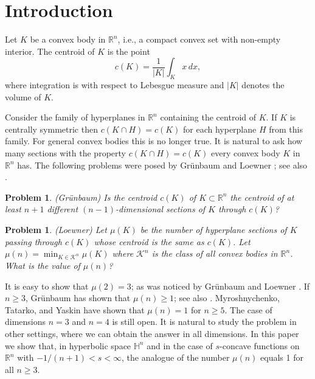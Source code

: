 \documentclass[12pt,letterpaper,reqno]{amsart}
\newtheorem{problem}[theorem]{Problem}
\theoremstyle{definition}
\begin{document}
\section{Introduction}

Let $K$ be a convex body in $\mathbb{R}^n$, i.e., a compact convex set with non-empty interior. The centroid of $K$ is the point
\begin{equation}\label{def-centroid}
c(K) = \frac{1}{|K|} \int_K x \, dx,
\end{equation}
where integration is with respect to Lebesgue measure and $|K|$ denotes the volume of $K$.


Consider the family of hyperplanes in $\mathbb R^n$ containing the centroid of $K$. If $K$ is centrally symmetric then $c(K\cap H)=c(K)$ for each hyperplane $H$ from this family. For general convex bodies this is no longer true. It is natural to ask  how many  sections with the property $c(K\cap H)=c(K)$ every  convex body $K$ in $\mathbb R^n$ has. The following problems were posed by Gr\"unbaum \cite{G1961} and Loewner \cite[Problem 28]{F}; see also \cite[A8]{CFG}.

\begin{problem}\label{GrunbaumProblem} (Gr\"unbaum)
	Is the centroid $c(K)$ of $K \subset \mathbb{R}^n$ the centroid of at least $n + 1$ different $(n-1)$-dimensional sections of $K$ through $c(K)$?
\end{problem}



\begin{problem}\label{LoewnerProblem} (Loewner)
	Let $\mu(K)$ be the number of hyperplane sections of $K$ passing through $c(K)$ whose centroid is the same as $c(K)$. Let $\mu(n) =\displaystyle \min_{K\in \mathcal K^n} \mu(K)$ where $\mathcal K^n$ is the class of all convex bodies in $\mathbb R^n$. What is the value of $\mu(n)$?

\end{problem}


It is easy to show that $\mu(2)=3$; as was noticed by Gr\"unbaum \cite{G1961} and Loewner \cite[Problem 28]{F}. If $n\ge 3$, Gr\"unbaum \cite{G1961} has shown that $\mu(n)\ge 1$;  see also \cite{MR}. 
Myroshnychenko, Tatarko, and Yaskin \cite{MTY2} have shown  that $\mu(n)=1$ for $n\ge 5$. The case of dimensions $n=3$ and $n=4$ is still open. It is natural to study the problem in other settings, where we can obtain the answer in all dimensions.
In this paper we show that, in  hyperbolic space $\mathbb H^n$ and in the case of $s$-concave functions on $\mathbb R^n$ with $-1/(n+1)<s<\infty$, the analogue of the number $\mu(n)$ equals 1 for all $n\ge 3$.
\end{document}

